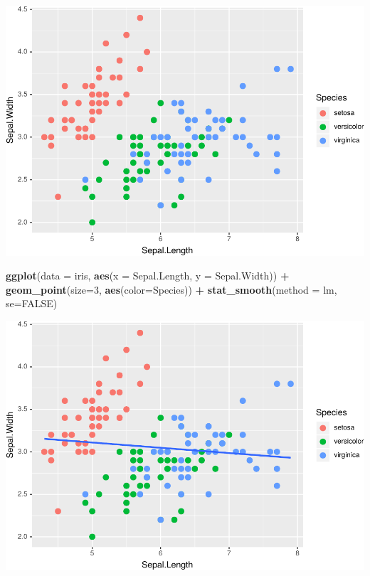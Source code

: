 \documentclass[]{krantz}
\makeatletter
\newenvironment{Shaded}{\begin{snugshade}}{\end{snugshade}}
\newcommand{\DataTypeTok}[1]{\textcolor[rgb]{0.27,0.27,0.27}{#1}}
\newcommand{\DecValTok}[1]{\textcolor[rgb]{0.06,0.06,0.06}{#1}}
\newcommand{\KeywordTok}[1]{\textcolor[rgb]{0.27,0.27,0.27}{\textbf{#1}}}
\newcommand{\NormalTok}[1]{#1}
\newcommand{\OperatorTok}[1]{\textcolor[rgb]{0.43,0.43,0.43}{\textbf{#1}}}
\newcommand{\OtherTok}[1]{\textcolor[rgb]{0.37,0.37,0.37}{#1}}
\newcommand{\StringTok}[1]{\textcolor[rgb]{0.5,0.5,0.5}{#1}}
\newenvironment{kframe}{%
\medskip{}
\setlength{\fboxsep}{.8em}
 \def\at@end@of@kframe{}%
 \ifinner\ifhmode%
  \def\at@end@of@kframe{\end{minipage}}%
  \begin{minipage}{\columnwidth}%
 \fi\fi%
 \def\FrameCommand##1{\hskip\@totalleftmargin \hskip-\fboxsep
 \colorbox{shadecolor}{##1}\hskip-\fboxsep
     \hskip-\linewidth \hskip-\@totalleftmargin \hskip\columnwidth}%
 \MakeFramed {\advance\hsize-\width
   \@totalleftmargin\z@ \linewidth\hsize
   \@setminipage}}%
 {\par\unskip\endMakeFramed%
 \at@end@of@kframe}
\renewenvironment{Shaded}{\begin{kframe}}{\end{kframe}}
\makeatother
\begin{document}
\includegraphics{bookdown_files/figure-latex/unnamed-chunk-62-1.pdf}

\begin{Shaded}
\begin{Highlighting}[]
\KeywordTok{ggplot}\NormalTok{(}\DataTypeTok{data =}\NormalTok{ iris, }\KeywordTok{aes}\NormalTok{(}\DataTypeTok{x =}\NormalTok{ Sepal.Length, }\DataTypeTok{y =}\NormalTok{ Sepal.Width)) }\OperatorTok{+}\StringTok{ }
\StringTok{    }\KeywordTok{geom_point}\NormalTok{(}\DataTypeTok{size=}\DecValTok{3}\NormalTok{, }\KeywordTok{aes}\NormalTok{(}\DataTypeTok{color=}\NormalTok{Species)) }\OperatorTok{+}\StringTok{ }
\StringTok{    }\KeywordTok{stat_smooth}\NormalTok{(}\DataTypeTok{method =}\NormalTok{ lm, }\DataTypeTok{se=}\OtherTok{FALSE}\NormalTok{)}
\end{Highlighting}
\end{Shaded}

\includegraphics{bookdown_files/figure-latex/unnamed-chunk-62-2.pdf}
\end{document}
